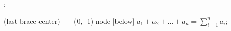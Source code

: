 ;


 (last brace center) -- +(0, -1)
    node [below]
    {$a_1 + a_2 + \dots + a_n = \displaystyle\sum_{i=1}^n a_i$};
 